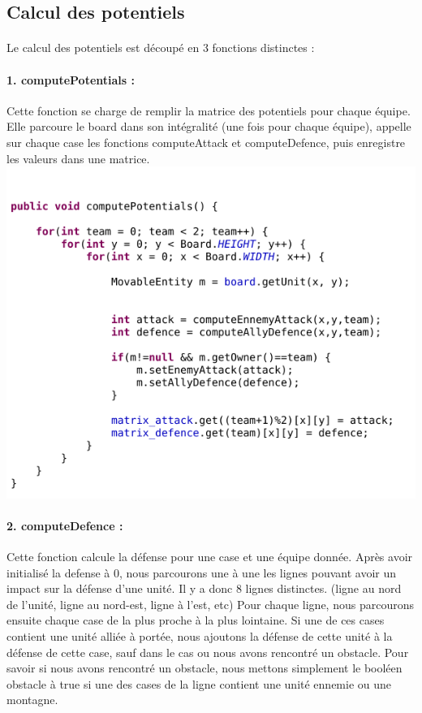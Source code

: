 		\subsection{Calcul des potentiels}
		
			\paragraph{}
			Le calcul des potentiels est découpé en 3 fonctions distinctes :
			
			\paragraph{1. computePotentials : }
			Cette fonction se charge de remplir la matrice des potentiels pour chaque équipe.
			Elle parcoure le board dans son intégralité (une fois pour chaque équipe), appelle sur chaque case les fonctions computeAttack et 
			computeDefence, puis enregistre les valeurs dans une matrice.\\
			\includegraphics[scale=0.4]{images/implementation/computePotentials.png}
			
			\paragraph{2. computeDefence : }
			Cette fonction calcule la défense pour une case et une équipe donnée.
			Après avoir initialisé la defense à 0, nous parcourons une à une les lignes pouvant avoir un impact sur la défense d'une unité.
			Il y a donc 8 lignes distinctes. (ligne au nord de l'unité, ligne au nord-est, ligne à l'est, etc)
			Pour chaque ligne, nous parcourons ensuite chaque case de la plus proche à la plus lointaine.
			Si une de ces cases contient une unité alliée à portée, nous ajoutons la défense de cette unité à la défense de cette case, 
			sauf dans le cas ou nous avons rencontré un obstacle.
			Pour savoir si nous avons rencontré un obstacle, nous mettons simplement le booléen obstacle à true si une des cases de la 
			ligne contient une unité ennemie ou une montagne.
			

